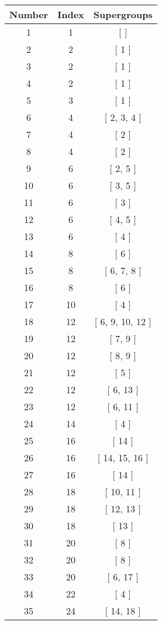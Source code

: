 \begin{center}
\begin{longtable}[H]{|| c c c ||}
\hline
Number & Index & Supergroups \\ 
\hline
1 & 1 & [ ] \\ 
\hline
2 & 2 & [ 1 ] \\ 
\hline
3 & 2 & [ 1 ] \\ 
\hline
4 & 2 & [ 1 ] \\ 
\hline
5 & 3 & [ 1 ] \\ 
\hline
6 & 4 & [ 2, 3, 4 ] \\ 
\hline
7 & 4 & [ 2 ] \\ 
\hline
8 & 4 & [ 2 ] \\ 
\hline
9 & 6 & [ 2, 5 ] \\ 
\hline
10 & 6 & [ 3, 5 ] \\ 
\hline
11 & 6 & [ 3 ] \\ 
\hline
12 & 6 & [ 4, 5 ] \\ 
\hline
13 & 6 & [ 4 ] \\ 
\hline
14 & 8 & [ 6 ] \\ 
\hline
15 & 8 & [ 6, 7, 8 ] \\ 
\hline
16 & 8 & [ 6 ] \\ 
\hline
17 & 10 & [ 4 ] \\ 
\hline
18 & 12 & [ 6, 9, 10, 12 ] \\ 
\hline
19 & 12 & [ 7, 9 ] \\ 
\hline
20 & 12 & [ 8, 9 ] \\ 
\hline
21 & 12 & [ 5 ] \\ 
\hline
22 & 12 & [ 6, 13 ] \\ 
\hline
23 & 12 & [ 6, 11 ] \\ 
\hline
24 & 14 & [ 4 ] \\ 
\hline
25 & 16 & [ 14 ] \\ 
\hline
26 & 16 & [ 14, 15, 16 ] \\ 
\hline
27 & 16 & [ 14 ] \\ 
\hline
28 & 18 & [ 10, 11 ] \\ 
\hline
29 & 18 & [ 12, 13 ] \\ 
\hline
30 & 18 & [ 13 ] \\ 
\hline
31 & 20 & [ 8 ] \\ 
\hline
32 & 20 & [ 8 ] \\ 
\hline
33 & 20 & [ 6, 17 ] \\ 
\hline
34 & 22 & [ 4 ] \\ 
\hline
35 & 24 & [ 14, 18 ] \\ 

\end{longtable}
\end{center}
